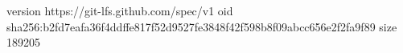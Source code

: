 version https://git-lfs.github.com/spec/v1
oid sha256:b2fd7eafa36f4ddffe817f52d9527fe3848f42f598b8f09abcc656e2f2fa9f89
size 189205
